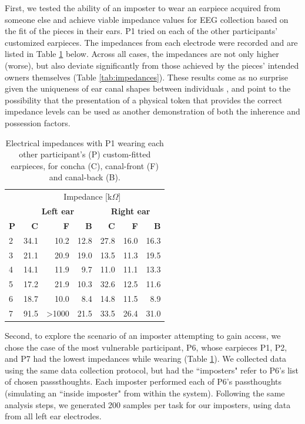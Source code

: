 \documentclass[a4paper,twoside]{article}
\begin{document}
First, we tested the ability of an imposter to wear an earpiece acquired from someone else and achieve viable impedance values for EEG collection based on the fit of the pieces in their ears. P1 tried on each of the other participants' customized earpieces. The impedances from each electrode were recorded and are listed in Table \ref{tab:p1_imposter_impedances} below. Across all cases, the impedances are not only higher (worse), but also deviate significantly from those achieved by the pieces' intended owners themselves (Table \ref{tab:impedances}). These results come as no surprise given the uniqueness of ear canal shapes between individuals \cite{Akkermans2005}, and point to the possibility that the presentation of a physical token that provides the correct impedance levels can be used as another demonstration of both the inherence and possession factors.

\begin{table}%
\caption{Electrical impedances with P1 wearing each other participant's (P) custom-fitted earpieces, for concha (C), canal-front (F) and canal-back (B).}
\label{tab:p1_imposter_impedances}
\begin{center}
\begin{tabular}{lrrrrrr}
& \multicolumn{6}{c}{Impedance [k\(\Omega\)]} \\
\cline{2-7}
& \multicolumn{3}{|c|}{\textbf{Left ear}} & \multicolumn{3}{c|}{\textbf{Right ear}} \\
\textbf{P} & \textbf{C} & \textbf{F} & \textbf{B} & \textbf{C} & \textbf{F} & \textbf{B} \\
\hline
2 & 34.1 & 10.2 & 12.8 & 27.8 & 16.0 & 16.3\\
3 & 21.1 & 20.9 & 19.0 & 13.5 & 11.3 & 19.5\\
4 & 14.1 & 11.9 & 9.7 & 11.0 & 11.1 & 13.3\\
5 & 17.2 & 21.9 & 10.3 & 32.6 & 12.5 & 11.6\\
6 & 18.7 & 10.0 & 8.4 & 14.8 & 11.5 & 8.9\\
7 & 91.5 & \textgreater1000 & 21.5 & 33.5 & 26.4 & 31.0\\
\hline
\end{tabular}
\end{center}
\end{table}

Second, to explore the scenario of an imposter attempting to gain access, we chose the case of the most vulnerable participant, P6, whose earpieces P1, P2, and P7 had the lowest impedances while wearing (Table \ref{tab:p1_imposter_impedances}). We collected data using the same data collection protocol, but had the ``imposters" refer to P6's list of chosen passsthoughts.
Each imposter performed each of P6's passthoughts (simulating an ``inside imposter" from within the system). Following the same analysis steps, we generated 200 samples per task for our imposters, using data from all left ear electrodes.
\end{document}

